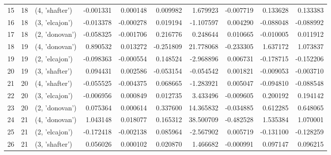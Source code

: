 \begin{tabular}{lrlrrrrrrr}
15 &     18 &  (4, 'shafter') & -0.001331 &  0.000148 &  0.009982 &   1.679923 & -0.007719 &  0.133628 &  0.133383 \\
16 &     18 &  (3, 'elcajon') & -0.013378 & -0.000278 &  0.019194 &  -1.107597 &  0.004290 & -0.088048 & -0.088992 \\
17 &     18 &  (2, 'donovan') & -0.058325 & -0.001706 &  0.216776 &   0.248644 &  0.010665 & -0.010005 &  0.011912 \\
18 &     19 &  (4, 'donovan') &  0.890532 &  0.013272 & -0.251809 &  21.778068 & -0.233305 &  1.637172 &  1.073837 \\
19 &     19 &  (2, 'elcajon') & -0.098363 & -0.000554 &  0.148524 &  -2.968896 &  0.006731 & -0.178715 & -0.152206 \\
20 &     19 &  (3, 'shafter') &  0.094431 &  0.002586 & -0.053154 &  -0.054542 &  0.001821 & -0.009053 & -0.003710 \\
21 &     20 &  (4, 'shafter') & -0.055525 & -0.004375 &  0.068665 &  -1.283921 &  0.005047 & -0.094810 & -0.088548 \\
22 &     20 &  (3, 'elcajon') & -0.006956 &  0.000849 &  0.012735 &   3.433496 & -0.009605 &  0.200192 &  0.194142 \\
23 &     20 &  (2, 'donovan') &  0.075364 &  0.000614 &  0.337600 &  14.365832 & -0.034885 &  0.612285 &  0.648065 \\
24 &     21 &  (4, 'donovan') &  1.043148 &  0.018077 &  0.165312 &  38.500709 & -0.482528 &  1.535384 &  1.070001 \\
25 &     21 &  (2, 'elcajon') & -0.172418 & -0.002138 &  0.085964 &  -2.567902 &  0.005719 & -0.131100 & -0.128259 \\
26 &     21 &  (3, 'shafter') &  0.056026 &  0.000102 &  0.020870 &   1.466682 & -0.000991 &  0.097147 &  0.096215 \\
\bottomrule
\end{tabular}
